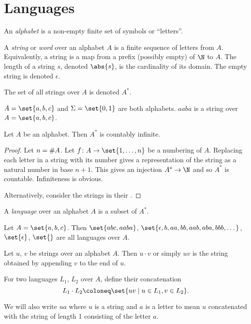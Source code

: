 \chapter{Languages} \label{chp:languages}

\begin{definition*}
    An \emph{alphabet} is a non-empty finite set of symbols or ``letters''.

    A \emph{string} or \emph{word} over an alphabet $A$ is a finite sequence
    of letters from $A$.
    Equivalently, a string is a map from a prefix (possibly empty) of $\N$
    to $A$.
    The length of a string $s$, denoted $\abs{s}$,
    is the cardinality of its domain.
    The empty string is denoted $\epsilon$.

    The set of all strings over $A$ is denoted $A^*$.
\end{definition*}
\begin{example}
    $A = \set{a, b, c}$ and $\Sigma = \set{0, 1}$ are both alphabets.
    $aaba$ is a string over $A = \set{a, b, c}$.
\end{example}

\begin{proposition}
    Let $A$ be an alphabet.
    Then $A^*$ is countably infinite.
\end{proposition}
\begin{proof}
    Let $n = \# A$.
    Let $f \colon A \to \set{1, \dots, n}$ be a numbering of $A$.
    Replacing each letter in a string with its number gives a representation
    of the string as a natural number in base $n + 1$.
    This gives an injection $A^* \to \N$ and so $A^*$ is countable.
    Infiniteness is obvious.

    Alternatively, consider the strings in their
    .
\end{proof}

\begin{definition*}[Language] \label{def:languages:language}
    A \emph{language} over an alphabet $A$ is a subset of $A^*$.
\end{definition*}
\begin{example}
    Let $A = \set{a, b, c}$.
    Then $\set{abc, aaba}$,
    $\set{\epsilon, b, aa, bb, aab, aba, bbb, \dots}$, $\set{\epsilon}$,
    $\set{}$ are all languages over $A$.
\end{example}

\begin{definition*}[Concatenation] \label{def:languages:concatenation}
    Let $u$, $v$ be strings over an alphabet $A$.
    Then $u \cdot v$ or simply $uv$ is the string obtained by appending $v$
    to the end of $u$.

    For two languages $L_1$, $L_2$ over $A$, define their concatenation \[
        L_1 \cdot L_2 \coloneq \set{uv \mid u \in L_1, v \in L_2}.
    \]
\end{definition*}
We will also write $ua$ where $u$ is a string and $a$ is a letter to mean
$u$ concatenated with the string of length 1 consisting of the letter $a$.

